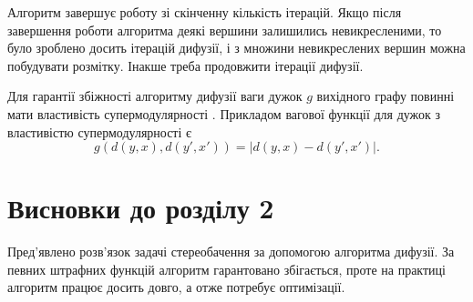 
Алгоритм завершує роботу зі скінченну кількість ітерацій.
Якщо після завершення роботи алгоритма деякі вершини залишились невикресленими,
то було зроблено досить ітерацій дифузії,
і з множини невикреслених вершин можна побудувати розмітку.
Інакше треба продовжити ітерації дифузії.


Для гарантії збіжності алгоритму дифузії ваги дужок $g$
вихідного графу повинні мати властивість супермодулярності
\cite{diffusion:shlezinger:supermodularity}.
Прикладом вагової функції для дужок з властивістю супермодулярності є
\begin{equation*}
    g \left( d \left( y, x \right), d \left( y', x' \right) \right)
    = \left| d \left( y, x \right) - d \left( y', x' \right) \right|.
\end{equation*}


\section*{Висновки до розділу 2}

Пред'явлено розв'язок задачі стереобачення за допомогою алгоритма дифузії.
За певних штрафних функцій алгоритм гарантовано збігається,
проте на практиці алгоритм працює досить довго, а отже потребує оптимізації.
